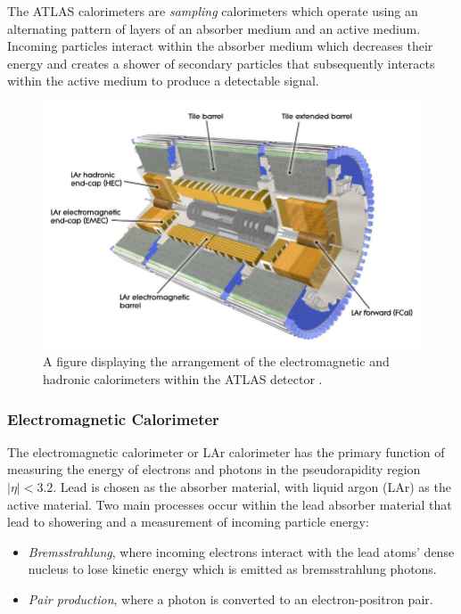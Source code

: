 \documentclass[12pt,a4paper,epsf,portrait,times,epsfig]{report}
\begin{document}
		The ATLAS calorimeters are \textit{sampling} calorimeters which operate using an alternating pattern of layers of an absorber medium and an active medium. Incoming particles interact within the absorber medium which decreases their energy and creates a shower of secondary particles that subsequently interacts within the active medium to produce a detectable signal.  

		\begin{figure}
			\centering
			\includegraphics[scale=0.4]{ATLAS_Calorimeters}
			\caption{A figure displaying the arrangement of the electromagnetic and hadronic calorimeters within the ATLAS detector \cite{AtlasCalImage}.}
			\label{Fig:ATLASCalorimeters} 
		\end{figure} 

		\subsubsection{Electromagnetic Calorimeter}\label{Section:ECal}

		The electromagnetic calorimeter or LAr calorimeter \cite{ATLASECalTDR} has the primary function of measuring the energy of electrons and photons in the pseudorapidity region $|\eta| < 3.2$. Lead is chosen as the absorber material, with liquid argon (LAr) as the active material. Two main processes occur within the lead absorber material that lead to showering and a measurement of incoming particle energy:
		
		\begin{itemize}
			\item \textit{Bremsstrahlung}, where incoming electrons interact with the lead atoms' dense nucleus to lose kinetic energy which is emitted as bremsstrahlung photons.
			\item \textit{Pair production}, where a photon is converted to an electron-positron pair.
		\end{itemize}
\end{document}
